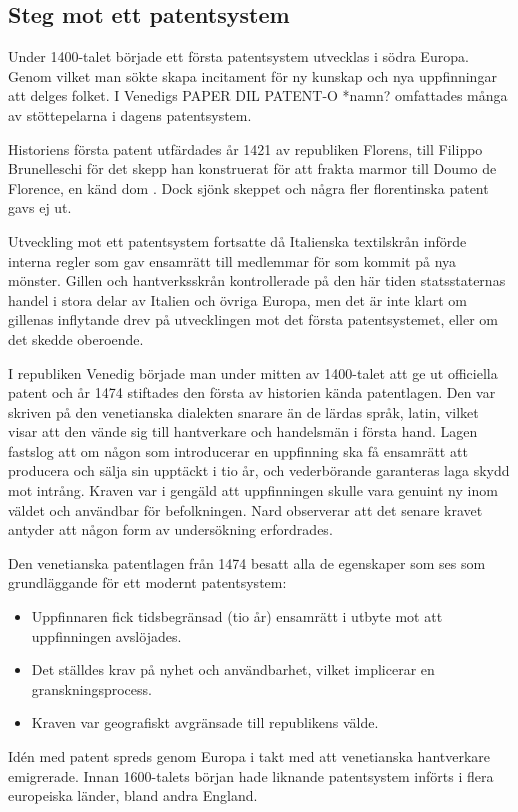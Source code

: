 \subsection{Steg mot ett patentsystem} %
\label{sub:steg_mot_ett_patent_system}

Under 1400-talet började ett första patentsystem utvecklas i södra Europa.
Genom vilket man sökte skapa incitament för ny kunskap och nya uppfinningar att delges folket. 
I Venedigs PAPER DIL PATENT-O *namn? omfattades många av stöttepelarna i dagens patentsystem.

Historiens första patent utfärdades år 1421 av republiken Florens, till Filippo Brunelleschi för det skepp han konstruerat för att frakta marmor till Doumo de Florence, en känd dom \cite{frumkin}. 
Dock sjönk skeppet och några fler florentinska patent gavs ej ut.

Utveckling mot ett patentsystem fortsatte då Italienska textilskrån införde interna regler som gav ensamrätt till medlemmar för som kommit på nya mönster.
Gillen och hantverksskrån kontrollerade på den här tiden statsstaternas handel i stora delar av Italien och övriga Europa, men det är inte klart om gillenas inflytande drev på utvecklingen mot det första patentsystemet, eller om det skedde oberoende.

I republiken Venedig började man under mitten av 1400-talet att ge ut officiella patent och år 1474 stiftades den första av historien kända patentlagen\cite{frumkin}.
Den var skriven på den venetianska dialekten snarare än de lärdas språk, latin, vilket visar att den vände sig till hantverkare och handelsmän i första hand.
Lagen fastslog att om någon som introducerar en uppfinning ska få ensamrätt att producera och sälja sin upptäckt i tio år, och vederbörande garanteras laga skydd mot intrång. 
Kraven var i gengäld att uppfinningen skulle vara genuint ny inom väldet och användbar för befolkningen. 
Nard observerar att det senare kravet antyder att någon form av undersökning erfordrades\cite{nard}. 

Den venetianska patentlagen från 1474 besatt alla de egenskaper som ses som grundläggande för ett modernt patentsystem:

\begin{itemize}
    \item Uppfinnaren fick tidsbegränsad (tio år) ensamrätt i utbyte mot att uppfinningen avslöjades.
    \item Det ställdes krav på nyhet och användbarhet, vilket implicerar en granskningsprocess.
    \item Kraven var geografiskt avgränsade till republikens välde.
\end{itemize}

Idén med patent spreds genom Europa i takt med att venetianska hantverkare emigrerade. 
Innan 1600-talets början hade liknande patentsystem införts i flera europeiska länder, bland andra England.

